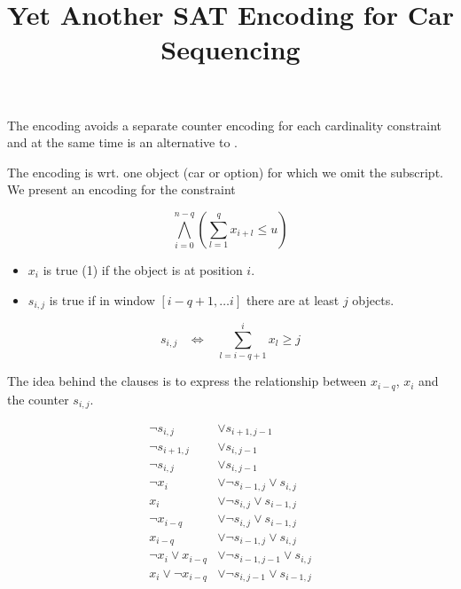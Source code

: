 \documentclass{article}
\title{Yet Another SAT Encoding for Car Sequencing}
\begin{document}
\maketitle

The encoding avoids a separate counter encoding for each cardinality
constraint and  at the same time is an alternative to \cite{Mayer13}. 

The encoding is wrt. one object (car or option) for which we omit the
subscript. We present an encoding for the constraint

$$\bigwedge_{i=0}^{n-q}(\sum_{l=1}^q x_{i+l} \leq u )$$

\begin{itemize}
    \item $x_i$ is true (1) if the object is at position $i$. 
    \item $s_{i,j}$ is true if in window $[i-q+1, \ldots i]$ there are at least $j$ objects. 
\end{itemize}

$$s_{i,j} \;\;\; \Leftrightarrow \;\;\; \sum_{l=i-q+1}^i x_l \geq j $$

The idea behind the clauses is to express the relationship between $x_{i-q}$,
$x_i$ and the counter $s_{i,j}$. 

\begin{align}
    \neg s_{i,j} & \vee s_{i+1,j-1} \\
    \neg s_{i+1,j} & \vee s_{i,j-1} \\
    \neg s_{i,j} & \vee s_{i,j-1} \\
    \neg x_i & \vee \neg s_{i-1,j} \vee s_{i,j} \\
         x_i & \vee \neg s_{i,j} \vee s_{i-1,j} \\
    \neg x_{i-q} & \vee \neg s_{i,j} \vee s_{i-1,j} \\
         x_{i-q} & \vee \neg s_{i-1,j} \vee s_{i,j} \\
    \neg x_i \vee x_{i-q} & \vee \neg s_{i-1,j-1} \vee s_{i,j} \\
         x_i \vee \neg x_{i-q} & \vee \neg s_{i,j-1} \vee s_{i-1,j}
\end{align}
\end{document}
